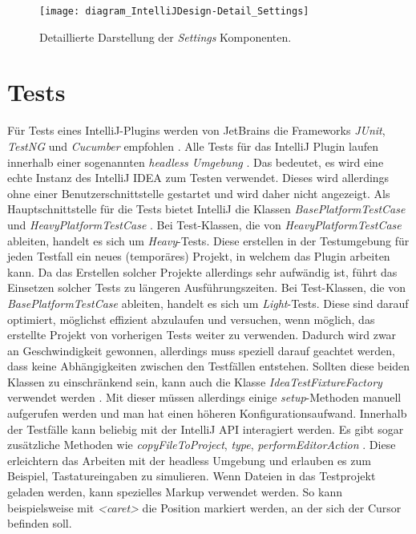 \begin{figure}
    \centering
    \texttt{[image: diagram\_IntelliJDesign-Detail\_Settings]}
    \caption{Detaillierte Darstellung der \emph{Settings} Komponenten.}
    \label{fig:diagram_IntelliJDesign-Detail_Settings}
\end{figure}

\section{Tests}
\label{sec:EntwicklungIntelliJ_Tests}

Für Tests eines IntelliJ-Plugins werden von JetBrains 
die Frameworks \emph{JUnit}, \emph{TestNG} und \emph{Cucumber} empfohlen
\cite{IntelliJPlatformSDKTestsAndFixtures}. 
Alle Tests für das IntelliJ Plugin laufen innerhalb einer sogenannten
\emph{headless Umgebung} \cite{IntelliJPlatformSDKTestingOverview}. 
Das bedeutet, es wird eine echte Instanz
des IntelliJ IDEA zum Testen verwendet. Dieses wird allerdings ohne einer
Benutzerschnittstelle gestartet und wird daher nicht angezeigt.
Als Hauptschnittstelle für die Tests bietet IntelliJ die Klassen
\emph{BasePlatformTestCase} und \emph{HeavyPlatformTestCase}
\cite{IntelliJPlatformSDKLightAndHeavyTests}.
Bei Test-Klassen, die von \emph{HeavyPlatformTestCase} ableiten,
handelt es sich um \emph{Heavy}-Tests. Diese erstellen in
der Testumgebung für jeden Testfall ein neues (temporäres)
Projekt, in welchem das Plugin arbeiten kann. Da das Erstellen solcher
Projekte allerdings sehr aufwändig ist, führt das Einsetzen solcher
Tests zu längeren Ausführungszeiten.
Bei Test-Klassen, die von \emph{BasePlatformTestCase} ableiten,
handelt es sich um \emph{Light}-Tests. Diese sind darauf optimiert,
möglichst effizient abzulaufen und versuchen, wenn möglich, das 
erstellte Projekt von vorherigen Tests weiter zu verwenden.
Dadurch wird zwar an Geschwindigkeit gewonnen, allerdings
muss speziell darauf geachtet werden, dass keine Abhängigkeiten zwischen
den Testfällen entstehen.
Sollten diese beiden Klassen zu einschränkend sein, kann auch die
Klasse \emph{IdeaTestFixtureFactory} verwendet werden
\cite{IntelliJPlatformSDKTestsAndFixtures}. Mit dieser
müssen allerdings einige \emph{setup}-Methoden manuell aufgerufen
werden und man hat einen höheren Konfigurationsaufwand.
Innerhalb der Testfälle kann beliebig mit der IntelliJ API interagiert
werden. Es gibt sogar zusätzliche Methoden wie \emph{copyFileToProject},
\emph{type}, \emph{performEditorAction}
\cite{IntelliJPlatformSDKTestProjectAndTestdataDirectories,IntelliJPlatformSDKWritingTests}. 
Diese erleichtern das Arbeiten mit der headless Umgebung 
und erlauben es zum Beispiel, Tastatureingaben zu simulieren.
Wenn Dateien in das Testprojekt geladen werden, kann spezielles Markup
verwendet werden. So kann beispielsweise mit \emph{<caret>} die Position
markiert werden, an der sich der Cursor befinden soll.

